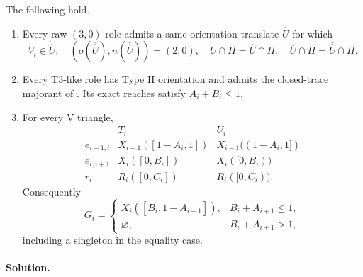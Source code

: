 \begin{lemma}
\label{lem:app-exact-trace-normalizations}
The following hold.
\begin{enumerate}
 \item Every raw $(3,0)$ role admits a same-orientation translate
 $\widehat U$ for which
 \[
  V_i\in\widehat U,
  \quad (o(\overline{\widehat U}),n(\overline{\widehat U}))=(2,0),
  \quad U\cap H=\widehat U\cap H,
  \quad \overline U\cap H=\overline{\widehat U}\cap H.
 \]
 \item Every T3-like role has Type II orientation and admits the
 closed-trace majorant of .  Its exact reaches
 satisfy $A_i+B_i\le1$.
 \item For every V triangle,
 \[
  \begin{array}{c|c|c}
  &T_i&U_i\\ \hline
  e_{i-1,i}&X_{i-1}([1-A_i,1])&X_{i-1}((1-A_i,1])\\
  e_{i,i+1}&X_i([0,B_i])&X_i([0,B_i))\\
  r_i&R_i([0,C_i])&R_i([0,C_i)).
  \end{array}
 \]
 Consequently
 \[
 G_i=
 \begin{cases}
 X_i([B_i,1-A_{i+1}]),&B_i+A_{i+1}\le1,\\
 \varnothing,&B_i+A_{i+1}>1,
 \end{cases}
 \]
 including a singleton in the equality case.
\end{enumerate}
\end{lemma}

\paragraph{Solution.}

